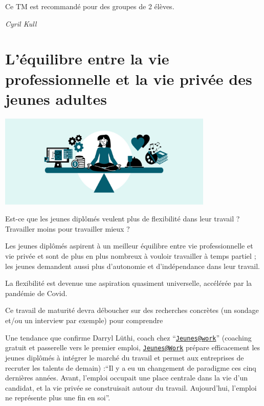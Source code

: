 \documentclass[
  10pt,
  french,
  a5paper,
  openany]{book}
\newenvironment{signature}{\begin{flushright}}{\end{flushright}}
\begin{document}
Ce TM est recommandé pour des groupes de 2 élèves.

\begin{signature}
\emph{Cyril Kull}

\end{signature}

\hypertarget{luxe9quilibre-entre-la-vie-professionnelle-et-la-vie-privuxe9e-des-jeunes-adultes}{%
\chapter{\texorpdfstring{L'équilibre entre la vie professionnelle \linebreak et la vie privée des jeunes adultes}{L'équilibre entre la vie professionnelle et la vie privée des jeunes adultes}}\label{luxe9quilibre-entre-la-vie-professionnelle-et-la-vie-privuxe9e-des-jeunes-adultes}}

\begin{center}
\includegraphics[width=\textwidth,height=12em]{images/equilibre-vie-professionnelle-prive-jeunes-adultes.jpg}

\end{center}

Est-ce que les jeunes diplômés veulent plus de flexibilité dans leur travail ? Travailler moins pour travailler mieux ?

Les jeunes diplômés aspirent à un meilleur équilibre entre vie professionnelle et vie privée et sont de plus en plus nombreux à vouloir travailler à temps partiel ; les jeunes demandent aussi plus d'autonomie et d'indépendance dans leur travail.

La flexibilité est devenue une aspiration quasiment universelle, accélérée par la pandémie de Covid.

Ce travail de maturité devra déboucher sur des recherches concrètes (un sondage et/ou un interview par exemple) pour comprendre

Une tendance que confirme Darryl Lüthi, coach chez ``\href{mailto:Jeunes@work}{\nolinkurl{Jeunes@work}}'' (coaching gratuit et passerelle vers le premier emploi, \href{mailto:Jeunes@Work}{\nolinkurl{Jeunes@Work}} prépare efficacement les jeunes diplômés à intégrer le marché du travail et permet aux entreprises de recruter les talents de demain) :``Il y a eu un changement de paradigme ces cinq dernières années. Avant, l'emploi occupait une place centrale dans la vie d'un candidat, et la vie privée se construisait autour du travail. Aujourd'hui, l'emploi ne représente plus une fin en soi''.
\end{document}
